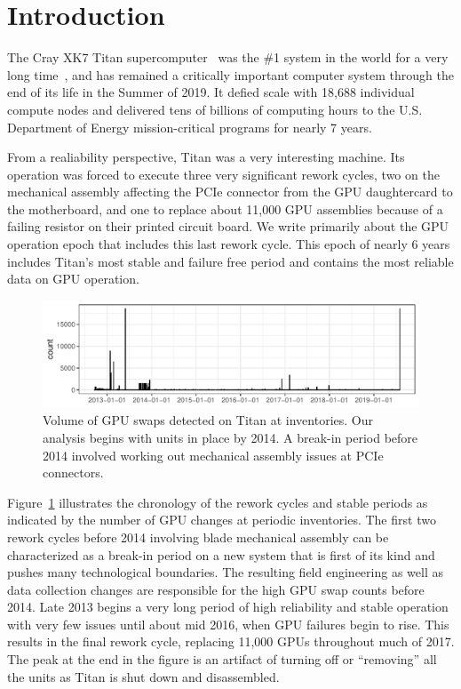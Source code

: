 \section{Introduction}
\label{section:introduction}
The Cray XK7 Titan supercomputer~\cite{olcf:titan} was the \#1 system
in the world for a very long time~\cite{top500list}, and has remained
a critically important computer system through the end of its life in
the Summer of 2019. It defied scale with 18,688 individual compute
nodes and delivered tens of billions of computing hours to the
U.S. Department of Energy mission-critical programs for nearly 7
years.
 
From a realiability perspective, Titan was a very interesting
machine. Its operation was forced to execute three very significant
rework cycles, two on the mechanical assembly affecting the PCIe
connector from the GPU daughtercard to the motherboard, and one to
replace about 11,000 GPU assemblies because of a failing resistor on
their printed circuit board. We write primarily about the GPU
operation epoch that includes this last rework cycle. This epoch of
nearly 6 years includes Titan's most stable and failure free period
and contains the most reliable data on GPU operation.

\begin{figure}[tb]
  \centering
  \includegraphics[width=\textwidth]{figs/chronology001.pdf}
  \caption{Volume of GPU swaps detected on Titan at inventories. Our
    analysis begins with units in place by 2014. A break-in period
    before 2014 involved working out mechanical assembly issues at
    PCIe connectors.}
  \label{fig:chronology}
\end{figure}
Figure~\ref{fig:chronology} illustrates the chronology of the rework
cycles and stable periods as indicated by the number of GPU changes at
periodic inventories.  The first two rework cycles before 2014
involving blade mechanical assembly can be characterized as a break-in
period on a new system that is first of its kind and pushes many
technological boundaries. The resulting field engineering as well as
data collection changes are responsible for the high GPU swap counts
before 2014. Late 2013 begins a very long period of high reliability
and stable operation with very few issues until about mid 2016, when
GPU failures begin to rise. This results in the final rework cycle,
replacing 11,000 GPUs throughout much of 2017. The peak at the end in
the figure is an artifact of turning off or ``removing'' all the
units as Titan is shut down and disassembled.

